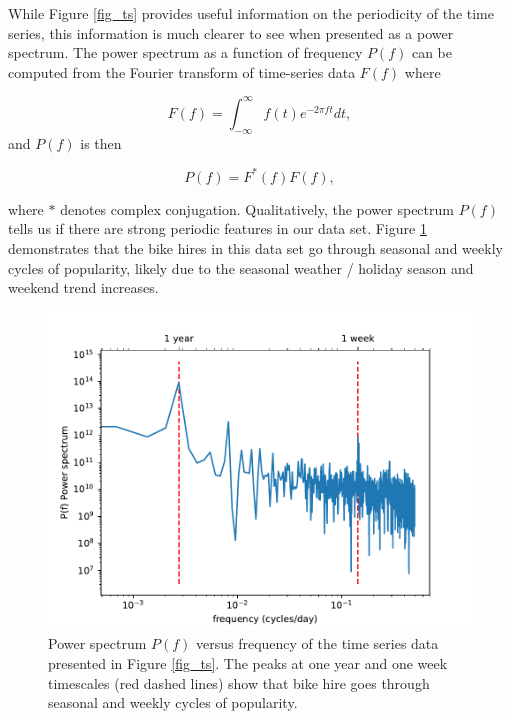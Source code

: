 \documentclass[10pt]{article}
\begin{document}
While Figure \ref{fig_ts} provides useful information on the periodicity of the time series, this information is much clearer to see when presented as a power spectrum. The power spectrum as a function of frequency $P(f)$ can be computed from the Fourier transform of time-series data $F(f)$ where

\begin{equation}
\label{eq_ft}
F(f) = \int_{-\infty}^{\infty} f(t) e^{-2\pi f t} dt,
\end{equation}
\noindent and $P(f)$ is then

\begin{equation}
\label{eq_ps}
P(f) = F^*(f) F(f),
\end{equation}

\noindent where $*$ denotes complex conjugation. Qualitatively, the power spectrum $P(f)$ tells us if there are strong periodic features in our data set. Figure \ref{fig_ps} demonstrates that the bike hires in this data set go through seasonal and weekly cycles of popularity, likely due to the seasonal weather / holiday season and weekend trend increases.





\begin{figure}
\begin{center}
\includegraphics[scale=1.0,angle=0,trim=0cm 0cm 0cm 0cm]{ps_plot.pdf}
\caption{Power spectrum $P(f)$ versus frequency of the time series data presented in Figure \ref{fig_ts}. The peaks at one year and one week timescales (red dashed lines) show that bike hire goes through seasonal and weekly cycles of popularity.}
\label{fig_ps}
\end{center}
\end{figure}
\end{document}
